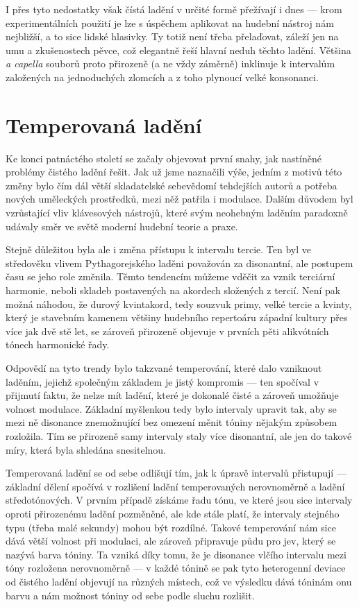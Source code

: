 \documentclass[12pt]{article}
\begin{document}
I přes tyto nedostatky však čístá ladění v určité formě přežívají i dnes — krom experimentálních použití je lze s úspěchem aplikovat na hudební nástroj nám nejbližší, a to sice lidské hlasivky. Ty totiž není třeba přelaďovat, záleží jen na umu a zkušenostech pěvce, což elegantně řeší hlavní neduh těchto ladění. Většina \emph{a capella} souborů proto přirozeně (a ne vždy záměrně) inklinuje k intervalům založených na jednoduchých zlomcích a z toho plynoucí velké konsonanci.
\pagebreak

\section{Temperovaná ladění}

Ke konci patnáctého století se začaly objevovat první snahy, jak nastíněné problémy čistého ladění řešit. Jak už jsme naznačili výše, jedním z motivů této změny bylo čím dál větší skladatelské sebevědomí tehdejších autorů a potřeba nových uměleckých prostředků, mezi něž patřila i modulace. Dalším důvodem byl vzrůstající vliv klávesových nástrojů, které svým neohebným laděním paradoxně udávaly směr ve světě moderní hudební teorie a praxe.

Stejně důležitou byla ale i změna přístupu k intervalu tercie. Ten byl ve středověku vlivem Pythagorejského laděni považován za disonantní, ale postupem času se jeho role změnila. Těmto tendencím můžeme vděčit za vznik terciární harmonie, neboli skladeb postavených na akordech složených z tercií. Není pak možná náhodou, že durový kvintakord, tedy souzvuk primy, velké tercie a kvinty, který je stavebním kamenem většiny hudebního repertoáru západní kultury přes více jak dvě stě let, se zároveň přirozeně objevuje v prvních pěti alikvótních tónech harmonické řady.

Odpovědí na tyto trendy bylo takzvané temperování, které dalo vzniknout laděním, jejichž společným základem je jistý kompromis — ten spočíval v přijmutí faktu, že nelze mít ladění, které je dokonalé čisté a zároveň umožňuje volnost modulace. Základní myšlenkou tedy bylo intervaly upravit tak, aby se mezi ně disonance znemožnující bez omezení měnit tóniny nějakým způsobem rozložila. Tím se přirozeně samy intervaly staly více disonantní, ale jen do takové míry, která byla shledána snesitelnou.

Temperovaná ladění se od sebe odlišují tím, jak k úpravě intervalů přistupují — základní dělení spočívá v rozlišení ladění temperovaných nerovnoměrně a ladění středotónových. V prvním případě získáme řadu tónu, ve které jsou sice intervaly oproti přirozenému ladění pozměněné, ale kde stále platí, že intervaly stejného typu (třeba malé sekundy) mohou být rozdílné. Takové temperování nám sice dává větší volnost při modulaci, ale zároveň připravuje půdu pro jev, který se nazývá barva tóniny. Ta vzniká díky tomu, že je disonance vlčího intervalu mezi tóny rozložena nerovnoměrně — v každé tónině se pak tyto heterogenní deviace od čistého ladění objevují na různých místech, což ve výsledku dává tóninám onu barvu a nám možnost tóniny od sebe podle sluchu rozlišit.
\end{document}
